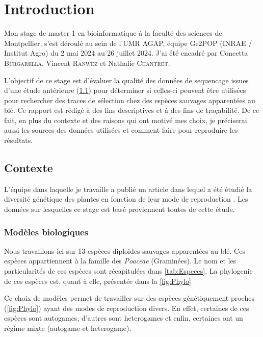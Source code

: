 \documentclass[../main]{subfiles} %
\begin{document}
\addto\extrasfrench{\protected\edef:{\unexpanded\expandafter{:}}}



\section{Introduction}

Mon stage de master 1 en bioinformatique à la faculté des sciences de Montpellier, s’est déroulé au sein de 
l’UMR AGAP, équipe Ge2POP (INRAE / Institut Agro) du 2 mai 2024 au 26 juillet 2024. J’ai été encadré par Concetta \textsc{Burgarella}, Vincent \textsc{Ranwez} et Nathalie \textsc{Chantret}. 

L’objectif de ce stage est d’évaluer la qualité des données de \gls{sequencage} issues d’une étude antérieure (\cref{Contexte}) pour déterminer si celles-ci peuvent être utilisées pour rechercher des traces de sélection chez des espèces sauvages apparentées au blé.  Ce rapport est rédigé à des fins descriptives et à des fins de traçabilité. De ce fait,  en plus du contexte et des raisons qui ont motivé mes choix, je préciserai aussi les sources des données utilisées et comment faire pour reproduire les résultats.

\subsection{Contexte}
\label{Contexte}
L’équipe dans laquelle je travaille a publié un article dans lequel a été étudié la diversité génétique des plantes en fonction de leur mode de reproduction \cite{burgarella_mating_2024}. Les données sur lesquelles ce stage est basé proviennent toutes de cette étude.

\subsubsection{Modèles biologiques}
\label{model_bio}
Nous travaillons ici sur 13 espèces \glspl{diploide} sauvages apparentées au blé. Ces espèces appartiennent à la famille des \textit{Poaceae} (Graminées). Le nom et les particularités de ces espèces sont récapitulées dans \cref{tab:Especes}. La \gls{phylogenie} de ces espèces est, quant à elle, présentée dans la \cref{fig:Phylo}




Ce choix de modèles permet de travailler sur des espèces génétiquement proches (\cref{fig:Phylo}) ayant des modes de reproduction divers. En effet, certaines de ces espèces sont \glspl{autogame}, d’autres sont \glspl{heterogame} et enfin, certaines ont un régime mixte (\gls{autogame} et \gls{heterogame}).
\end{document}

